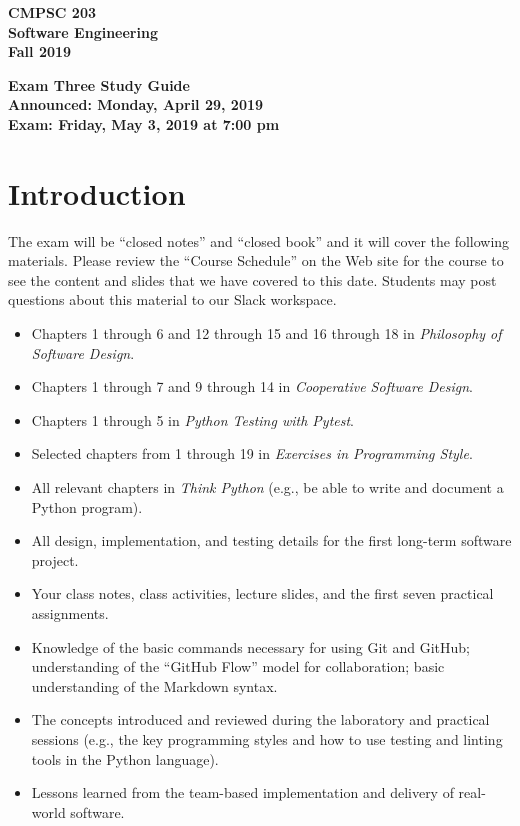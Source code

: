 \documentclass[11pt]{article}
\newcommand{\assignmentduedate}{May 3}
\newcommand{\assignmentassignedate}{April 29}
\newcommand{\assignmentnumber}{Three}
\newcommand{\labyear}{2019}
\newcommand{\assignedday}{Monday}
\newcommand{\dueday}{Friday}
\newcommand{\labtime}{7:00 pm}
\newcommand{\assigneddate}{Announced: \assignedday, \assignmentassignedate, \labyear{}}
\newcommand{\duedate}{Exam: \dueday, \assignmentduedate, \labyear{} at \labtime{}}
\newcommand{\cooperative}{{\em Cooperative Software Design\/}}
\newcommand{\philosophy}{{\em Philosophy of Software Design\/}}
\newcommand{\thinkpython}{{\em Think Python\/}}
\newcommand{\programmingstyle}{{\em Exercises in Programming Style\/}}
\newcommand{\pytest}{{\em Python Testing with Pytest\/}}
\newcommand{\guidetitle}[1]
{
  \begin{center}
    \begin{center}
      \bf
      CMPSC 203\\Software Engineering\\
      Fall 2019\\
      \medskip
    \end{center}
    \bf
    #1
  \end{center}
}
\begin{document}
\thispagestyle{empty}

\guidetitle{Exam \assignmentnumber{} Study Guide \\ \assigneddate{} \\ \duedate{}}

\section*{Introduction}

\noindent The exam will be ``closed notes'' and ``closed book'' and it will
cover the following materials. Please review the ``Course Schedule'' on the Web
site for the course to see the content and slides that we have covered to this
date. Students may post questions about this material to our Slack workspace.

\vspace*{-.5em}
\begin{itemize}

  \itemsep 0in

  \item Chapters 1 through 6 and 12 through 15 and 16 through 18 in \philosophy{}.

  \item Chapters 1 through 7 and 9 through 14 in \cooperative{}.

  \item Chapters 1 through 5 in \pytest{}.

  \item Selected chapters from 1 through 19 in \programmingstyle{}.

  \item All relevant chapters in \thinkpython{} (e.g., be able to write and
    document a Python program).

  \item All design, implementation, and testing details for the first long-term
    software project.

  \item Your class notes, class activities, lecture slides, and the first seven
    practical assignments.

  \item Knowledge of the basic commands necessary for using Git and GitHub;
    understanding of the ``GitHub Flow'' model for collaboration; basic
    understanding of the Markdown syntax.

  \item The concepts introduced and reviewed during the laboratory and practical
    sessions (e.g., the key programming styles and how to use testing and
    linting tools in the Python language).

  \item Lessons learned from the team-based implementation and delivery of
    real-world software.

\end{itemize}
\vspace*{-.5em}
\end{document}
